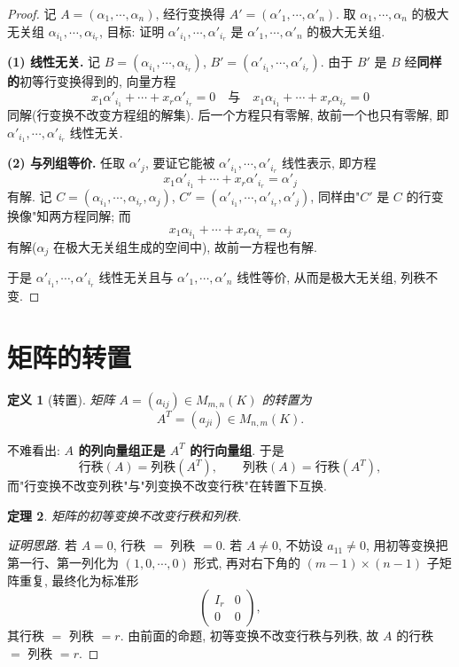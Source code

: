 \documentclass[UTF8,11pt]{ctexart}
\theoremstyle{cnthm}
\newtheorem{thm}{定理}[section]
\newtheorem{defn}[thm]{定义}
\begin{document}
\begin{proof}
记 $A=(\alpha_1,\cdots,\alpha_n)$, 经行变换得 $A'=(\alpha'_1,\cdots,\alpha'_n)$. 取 $\alpha_1,\cdots,\alpha_n$ 的极大无关组 $\alpha_{i_1},\cdots,\alpha_{i_r}$, 目标: 证明 $\alpha'_{i_1},\cdots,\alpha'_{i_r}$ 是 $\alpha'_1,\cdots,\alpha'_n$ 的极大无关组.

\textbf{(1) 线性无关.} 记 $B=(\alpha_{i_1},\cdots,\alpha_{i_r})$, $B'=(\alpha'_{i_1},\cdots,\alpha'_{i_r})$. 由于 $B'$ 是 $B$ 经\textbf{同样的}初等行变换得到的, 向量方程
\[
x_1\alpha'_{i_1}+\cdots+x_r\alpha'_{i_r}=0
\quad\text{与}\quad
x_1\alpha_{i_1}+\cdots+x_r\alpha_{i_r}=0
\]
同解(行变换不改变方程组的解集). 后一个方程只有零解, 故前一个也只有零解, 即 $\alpha'_{i_1},\cdots,\alpha'_{i_r}$ 线性无关.

\textbf{(2) 与列组等价.} 任取 $\alpha'_j$, 要证它能被 $\alpha'_{i_1},\cdots,\alpha'_{i_r}$ 线性表示, 即方程
\[
x_1\alpha'_{i_1}+\cdots+x_r\alpha'_{i_r}=\alpha'_j
\]
有解. 记 $C=(\alpha_{i_1},\cdots,\alpha_{i_r},\alpha_j)$, $C'=(\alpha'_{i_1},\cdots,\alpha'_{i_r},\alpha'_j)$, 同样由"$C'$ 是 $C$ 的行变换像"知两方程同解; 而
\[
x_1\alpha_{i_1}+\cdots+x_r\alpha_{i_r}=\alpha_j
\]
有解($\alpha_j$ 在极大无关组生成的空间中), 故前一方程也有解.

于是 $\alpha'_{i_1},\cdots,\alpha'_{i_r}$ 线性无关且与 $\alpha'_1,\cdots,\alpha'_n$ 线性等价, 从而是极大无关组, 列秩不变.
\end{proof}

\section{矩阵的转置}

\begin{defn}[转置]
矩阵 $A=(a_{ij})\in M_{m,n}(K)$ 的转置为
\[
A^{T}=(a_{ji})\in M_{n,m}(K).
\]
\end{defn}

不难看出: \textbf{$A$ 的列向量组正是 $A^{T}$ 的行向量组}. 于是
\[
\text{行秩}(A)=\text{列秩}(A^{T}),\qquad
\text{列秩}(A)=\text{行秩}(A^{T}),
\]
而"行变换不改变列秩"与"列变换不改变行秩"在转置下互换.

\begin{thm}
矩阵的初等变换不改变行秩和列秩.
\end{thm}

\begin{proof}[证明思路]
若 $A=0$, 行秩 $=$ 列秩 $=0$. 若 $A\neq0$, 不妨设 $a_{11}\neq0$, 用初等变换把第一行、第一列化为 $(1,0,\cdots,0)$ 形式, 再对右下角的 $(m-1)\times(n-1)$ 子矩阵重复, 最终化为标准形
\[
\begin{pmatrix}I_r&0\\0&0\end{pmatrix},
\]
其行秩 $=$ 列秩 $=r$. 由前面的命题, 初等变换不改变行秩与列秩, 故 $A$ 的行秩 $=$ 列秩 $=r$.
\end{proof}
\end{document}

